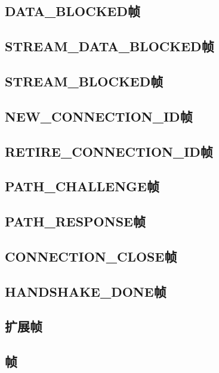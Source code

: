 \subsection{DATA\_BLOCKED帧}

\subsection{STREAM\_DATA\_BLOCKED帧}

\subsection{STREAM\_BLOCKED帧}

\subsection{NEW\_CONNECTION\_ID帧}

\subsection{RETIRE\_CONNECTION\_ID帧}

\subsection{PATH\_CHALLENGE帧}

\subsection{PATH\_RESPONSE帧}

\subsection{CONNECTION\_CLOSE帧}

\subsection{HANDSHAKE\_DONE帧}

\subsection{扩展帧}

\subsection{帧}
